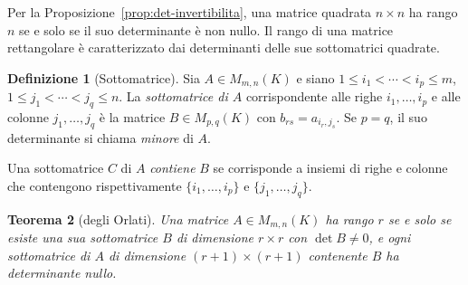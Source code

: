 \documentclass[11pt, a4paper]{book}
\theoremstyle{definition}
\newtheorem{definizione}{Definizione}[section]
\theoremstyle{plain}
\newtheorem{teorema}[definizione]{Teorema}
\theoremstyle{remark}
\begin{document}
Per la Proposizione~\ref{prop:det-invertibilita}, una matrice quadrata $n\times n$ ha rango $n$ se e solo se il suo determinante è non nullo. Il rango di una matrice rettangolare è caratterizzato dai determinanti delle sue sottomatrici quadrate.

\begin{defbox}
\begin{definizione}[Sottomatrice]
Sia $A \in M_{m,n}(K)$ e siano $1 \leq i_1 < \cdots < i_p \leq m$, $1\leq j_1 < \cdots < j_q \leq n$. La \emph{sottomatrice di $A$} corrispondente alle righe $i_1,\ldots,i_p$ e alle colonne $j_1,\ldots,j_q$ è la matrice $B \in M_{p,q}(K)$ con $b_{rs} = a_{i_r, j_s}$. Se $p=q$, il suo determinante si chiama \emph{minore} di $A$.

Una sottomatrice $C$ di $A$ \emph{contiene} $B$ se corrisponde a insiemi di righe e colonne che contengono rispettivamente $\{i_1,\ldots,i_p\}$ e $\{j_1,\ldots,j_q\}$.
\end{definizione}
\end{defbox}

\begin{teorema}[degli Orlati]
\label{thm:orlati}
Una matrice $A \in M_{m,n}(K)$ ha rango $r$ se e solo se esiste una sua sottomatrice $B$ di dimensione $r\times r$ con $\det B \neq 0$, e ogni sottomatrice di $A$ di dimensione $(r+1)\times(r+1)$ contenente $B$ ha determinante nullo.
\end{teorema}
\end{document}
